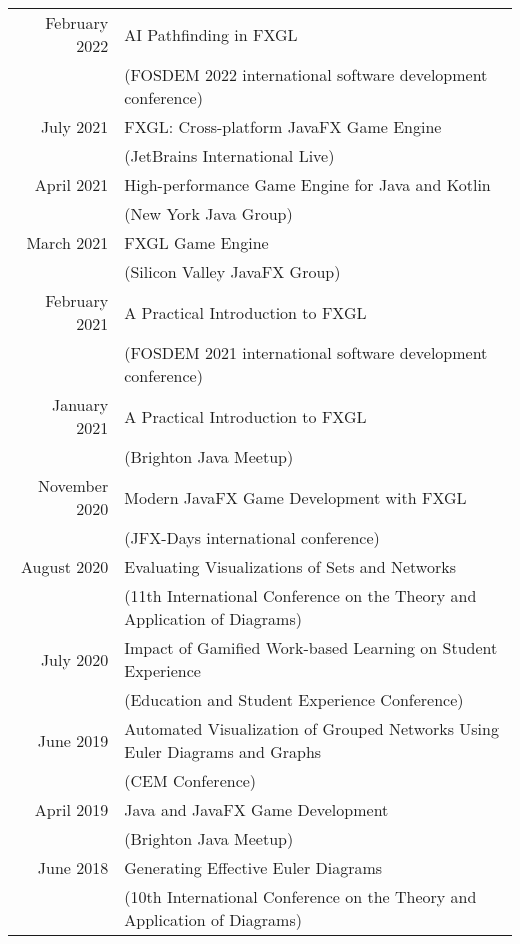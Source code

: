 \documentclass[a4paper,11pt]{article} %
\begin{document}
\begin{center}
\begin{tabular}{rl}

February 2022 & AI Pathfinding in FXGL\\ & (FOSDEM 2022 international software development conference) \\

July 2021 & FXGL: Cross-platform JavaFX Game Engine\\ & (JetBrains International Live) \\

April 2021 & High-performance Game Engine for Java and Kotlin \\ & (New York Java Group) \\

March 2021 & FXGL Game Engine\\ & (Silicon Valley JavaFX Group) \\

February 2021 & A Practical Introduction to FXGL\\ & (FOSDEM 2021 international software development conference) \\

January 2021 & A Practical Introduction to FXGL\\ & (Brighton Java Meetup) \\

November 2020 & Modern JavaFX Game Development with FXGL\\ & (JFX-Days international conference) \\

August 2020 & Evaluating Visualizations of Sets and Networks\\ & (11th International Conference on the Theory and Application of Diagrams) \\

July 2020 & Impact of Gamified Work-based Learning on Student Experience\\ & (Education and Student Experience Conference)\\

June 2019 & Automated Visualization of Grouped Networks Using Euler Diagrams and Graphs\\ & (CEM Conference) \\

April 2019 & Java and JavaFX Game Development\\ & (Brighton Java Meetup) \\

June 2018 & Generating Effective Euler Diagrams\\ & (10th International Conference on the Theory and Application of Diagrams) \\





\end{tabular}
\end{center}
\end{document}
